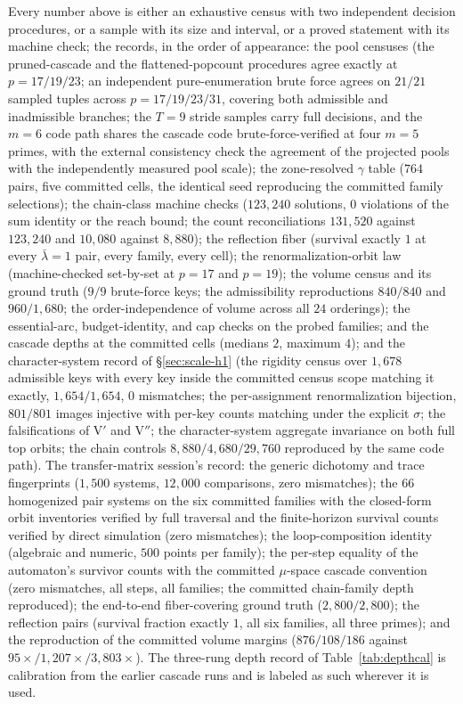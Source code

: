 Every number above is either an exhaustive census with two independent
decision procedures, or a sample with its size and interval, or a
proved statement with its machine check; the records, in the order of
appearance: the pool censuses (the pruned-cascade and the
flattened-popcount procedures agree exactly at $p=17/19/23$; an
independent pure-enumeration brute force agrees on $21/21$ sampled
tuples across $p=17/19/23/31$, covering both admissible and
inadmissible branches; the $T=9$ stride samples carry full decisions,
and the $m=6$ code path shares the cascade code brute-force-verified
at four $m=5$ primes, with the external consistency check the
agreement of the projected pools with the independently measured pool
scale); the zone-resolved $\gamma$ table ($764$ pairs, five committed
cells, the identical seed reproducing the committed family
selections); the chain-class machine checks ($123{,}240$ solutions,
$0$ violations of the sum identity or the reach bound; the count
reconciliations $131{,}520$ against $123{,}240$ and $10{,}080$ against
$8{,}880$); the reflection fiber (survival exactly $1$ at every
$\bar\lambda=1$ pair, every family, every cell); the
renormalization-orbit law (machine-checked set-by-set at $p=17$ and
$p=19$); the volume census and its ground truth ($9/9$ brute-force
keys; the admissibility reproductions $840/840$ and $960/1{,}680$; the
order-independence of volume across all $24$ orderings); the
essential-arc, budget-identity, and cap checks on the probed families;
and the cascade depths at the committed cells (medians $2$, maximum
$4$); and the character-system record of \S\ref{sec:scale-h1} (the
rigidity census over $1{,}678$ admissible keys with every key inside
the committed census scope matching it exactly, $1{,}654/1{,}654$, $0$
mismatches; the per-assignment renormalization bijection, $801/801$
images injective with per-key counts matching under the explicit
$\sigma$; the falsifications of V$'$ and V$''$; the character-system
aggregate invariance on both full top orbits; the chain controls
$8{,}880/4{,}680/29{,}760$ reproduced by the same code path). The
transfer-matrix session's record: the generic dichotomy and trace
fingerprints ($1{,}500$ systems, $12{,}000$ comparisons, zero
mismatches); the $66$ homogenized pair systems on the six committed
families with the closed-form orbit inventories verified by full
traversal and the finite-horizon survival counts verified by direct
simulation (zero mismatches); the loop-composition identity
(algebraic and numeric, $500$ points per family); the per-step
equality of the automaton's survivor counts with the committed
$\mu$-space cascade convention (zero mismatches, all steps, all
families; the committed chain-family depth reproduced); the
end-to-end fiber-covering ground truth ($2{,}800/2{,}800$); the
reflection pairs (survival fraction exactly $1$, all six families,
all three primes); and the reproduction of the committed volume
margins ($876/108/186$ against $95\times/1{,}207\times/3{,}803\times$).
The three-rung depth record of Table~\ref{tab:depthcal} is
calibration from the earlier cascade runs and is labeled as such
wherever it is used.

